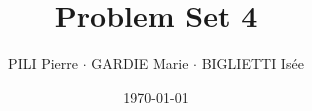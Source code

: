 \documentclass[12pt]{article}
\title{Problem Set 4}
\author{PILI Pierre $\cdot$ GARDIE Marie $\cdot$ BIGLIETTI Isée}
\date{\today}
\renewcommand{\thesubsection}{\arabic{section}.\arabic{subsection}}
\begin{document}
\maketitle
\renewcommand{\thesubsection}{\alph{subsection}}


\subsection{}

\subsection{}

\subsection{}

\subsection{}

\subsection{}

\subsection{}

\subsection{}
\end{document}
